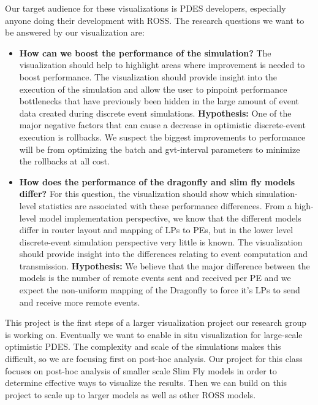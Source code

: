 \documentclass{acm_proc_article-sp}
\begin{document}
Our target audience for these visualizations is PDES developers, especially anyone doing their development with ROSS.  The research questions we want to be answered by our visualization are:
\begin{itemize}
\item \textbf{How can we boost the performance of the simulation?} The visualization should help to highlight areas where improvement is needed to boost performance. The visualization should provide insight into the execution of the simulation and allow the user to pinpoint performance bottlenecks that have previously been hidden in the large amount of event data created during discrete event simulations. \textbf{Hypothesis:} One of the major negative factors that can cause a decrease in optimistic discrete-event execution is rollbacks. We suspect the biggest improvements to performance will be from optimizing the batch and gvt-interval parameters to minimize the rollbacks at all cost.
\item  \textbf{How does the performance of the dragonfly and slim fly models differ?}  For this question, the visualization should show which simulation-level statistics are associated with these performance differences. From a high-level model implementation perspective, we know that the different models differ in router layout and mapping of LPs to PEs, but in the lower level discrete-event simulation perspective very little is known. The visualization should provide insight into the differences relating to event computation and transmission. \textbf{Hypothesis:} We believe that the major difference between the models is the number of remote events sent and received per PE and we expect the non-uniform mapping of the Dragonfly to force it's LPs to send and receive more remote events.
\end{itemize}

This project is the first steps of a larger visualization project our research group is working on.  Eventually we want to enable in situ visualization for large-scale optimistic PDES.  The complexity and scale of the simulations makes this difficult, so we are focusing first on post-hoc analysis.  Our project for this class focuses on post-hoc analysis of smaller scale Slim Fly models in order to determine effective ways to visualize the results.   Then we can build on this project to scale up to larger models as well as other ROSS models.
\end{document}
